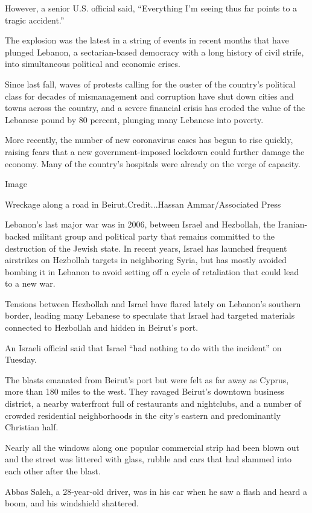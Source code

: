 However, a senior U.S. official said, ``Everything I'm seeing thus far
points to a tragic accident.''

The explosion was the latest in a string of events in recent months that
have plunged Lebanon, a sectarian-based democracy with a long history of
civil strife, into simultaneous political and economic crises.

Since last fall, waves of protests calling for the ouster of the
country's political class for decades of mismanagement and corruption
have shut down cities and towns across the country, and a severe
financial crisis has eroded the value of the Lebanese pound by 80
percent, plunging many Lebanese into poverty.

More recently, the number of new coronavirus cases has begun to rise
quickly, raising fears that a new government-imposed lockdown could
further damage the economy. Many of the country's hospitals were already
on the verge of capacity.

Image

Wreckage along a road in Beirut.Credit...Hassan Ammar/Associated Press

Lebanon's last major war was in 2006, between Israel and Hezbollah, the
Iranian-backed militant group and political party that remains committed
to the destruction of the Jewish state. In recent years, Israel has
launched frequent airstrikes on Hezbollah targets in neighboring Syria,
but has mostly avoided bombing it in Lebanon to avoid setting off a
cycle of retaliation that could lead to a new war.

Tensions between Hezbollah and Israel have flared lately on Lebanon's
southern border, leading many Lebanese to speculate that Israel had
targeted materials connected to Hezbollah and hidden in Beirut's port.

An Israeli official said that Israel ``had nothing to do with the
incident'' on Tuesday.

The blasts emanated from Beirut's port but were felt as far away as
Cyprus, more than 180 miles to the west. They ravaged Beirut's downtown
business district, a nearby waterfront full of restaurants and
nightclubs, and a number of crowded residential neighborhoods in the
city's eastern and predominantly Christian half.

Nearly all the windows along one popular commercial strip had been blown
out and the street was littered with glass, rubble and cars that had
slammed into each other after the blast.

Abbas Saleh, a 28-year-old driver, was in his car when he saw a flash
and heard a boom, and his windshield shattered.

